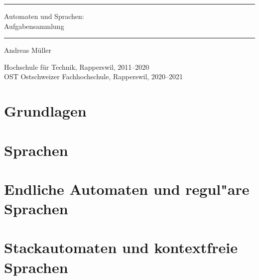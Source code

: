 \documentclass[a4paper,12pt]{book}
\begin{document}
\pagestyle{fancy}
\rhead{}
\frontmatter
\newcommand\HRule{\noindent\rule{\linewidth}{1.5pt}}
\begin{titlepage}
\HRule
\vspace*{2pt}
\begin{flushright}
{\Huge
Automaten und Sprachen:\\
\bigskip
Aufgabensammlung}
\end{flushright}
\HRule
\begin{flushright}
\vspace{30pt}
\LARGE
Andreas Müller
\end{flushright}
\begin{center}
Hochschule für Technik, Rapperswil, 2011--2020\\
OST Ostschweizer Fachhochschule, Rapperswil, 2020--2021
\end{center}
\end{titlepage}
\hypersetup{
        colorlinks=true,
        linktoc=all,
        linkcolor=blue
}
\tableofcontents
\newenvironment{beispiel}[1][Beispiel]{%
\begin{proof}[#1]%
\renewcommand{\qedsymbol}{$\bigcirc$}
}{\end{proof}}
\mainmatter

\allowdisplaybreaks
\openthemaindex
{}



\chapter{Grundlagen}

\chapter{Sprachen}

\chapter{Endliche Automaten und regul"are Sprachen}

\chapter{Stackautomaten und kontextfreie Sprachen}

\end{document}
